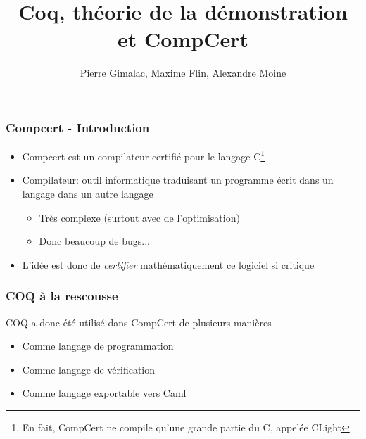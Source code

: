 \documentclass[11pt,a4paper]{beamer}
\title{Coq, théorie de la démonstration et CompCert}
\author{Pierre Gimalac, Maxime Flin, Alexandre Moine}
\begin{document}
\maketitle

\begin{frame}
\frametitle{Compcert - Introduction}
\begin{itemize}
\item Compcert est un compilateur certifié pour le langage C\footnote{En fait, CompCert ne compile qu'une grande partie du C, appelée CLight}
\item Compilateur: outil informatique traduisant un programme écrit dans un langage dans un autre langage
\begin{itemize}
	\item Très complexe (surtout avec de l'optimisation)
	\item Donc beaucoup de bugs...
\end{itemize}
\item L'idée est donc de \emph{certifier} mathématiquement ce logiciel si critique
\end{itemize}
\end{frame}

\begin{frame}
\frametitle{COQ à la rescousse}
COQ a donc été utilisé dans CompCert de plusieurs manières
\begin{itemize}
	\item Comme langage de programmation
	\item Comme langage de vérification
	\item Comme langage exportable vers Caml
\end{itemize}
\end{frame}
\end{document}
